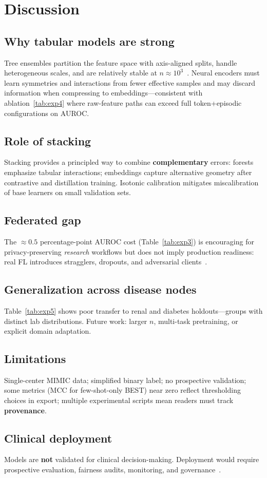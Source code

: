 \section{Discussion}
\label{sec:discuss}

\subsection{Why tabular models are strong}
Tree ensembles partition the feature space with axis-aligned splits, handle heterogeneous scales, and are relatively stable at $n \approx 10^3$~\citep{awad2017random,caruana2015intelligible}. Neural encoders must learn symmetries and interactions from fewer effective samples and may discard information when compressing to embeddings---consistent with ablation~\ref{tab:exp4} where raw-feature paths can exceed full token+episodic configurations on AUROC.

\subsection{Role of stacking}
Stacking provides a principled way to combine \textbf{complementary} errors: forests emphasize tabular interactions; embeddings capture alternative geometry after contrastive and distillation training. Isotonic calibration mitigates miscalibration of base learners on small validation sets.

\subsection{Federated gap}
The $\approx 0.5$ percentage-point AUROC cost (Table~\ref{tab:exp3}) is encouraging for privacy-preserving \emph{research} workflows but does not imply production readiness: real FL introduces stragglers, dropouts, and adversarial clients~\citep{kairouz2021advances}.

\subsection{Generalization across disease nodes}
Table~\ref{tab:exp5} shows poor transfer to renal and diabetes holdouts---groups with distinct lab distributions. Future work: larger $n$, multi-task pretraining, or explicit domain adaptation.

\subsection{Limitations}
Single-center MIMIC data; simplified binary label; no prospective validation; some metrics (MCC for few-shot-only BEST) near zero reflect thresholding choices in export; multiple experimental scripts mean readers must track \textbf{provenance}.

\subsection{Clinical deployment}
Models are \textbf{not} validated for clinical decision-making. Deployment would require prospective evaluation, fairness audits, monitoring, and governance~\citep{ghassemi2021practical}.

